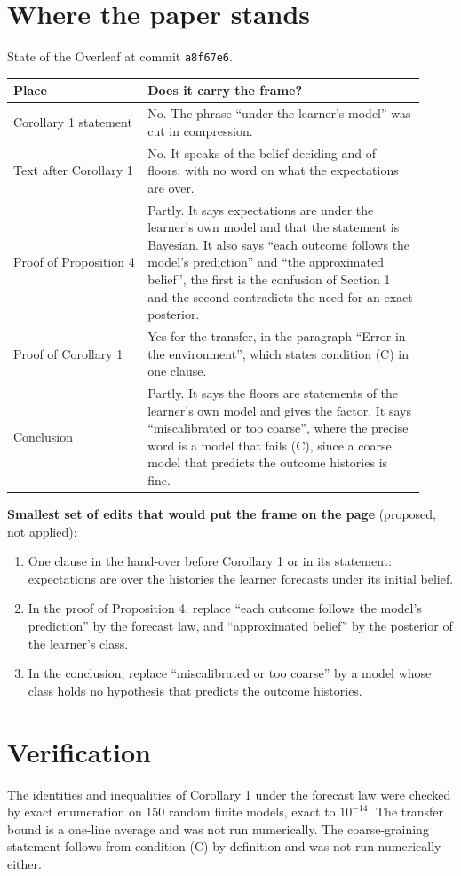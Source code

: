 \documentclass[10pt]{article}
\begin{document}
\section{Where the paper stands}
\label{sec:status}
State of the Overleaf at commit \texttt{a8f67e6}.
\begin{center}
\begin{tabular}{p{0.3\linewidth}p{0.62\linewidth}}
\toprule
Place & Does it carry the frame? \\
\midrule
Corollary 1 statement & No. The phrase ``under the learner's model'' was cut in compression. \\
Text after Corollary 1 & No. It speaks of the belief deciding and of floors, with no word on what the expectations are over. \\
Proof of Proposition 4 & Partly. It says expectations are under the learner's own model and that the statement is Bayesian. It also says ``each outcome follows the model's prediction'' and ``the approximated belief'', the first is the confusion of Section 1 and the second contradicts the need for an exact posterior. \\
Proof of Corollary 1 & Yes for the transfer, in the paragraph ``Error in the environment'', which states condition (C) in one clause. \\
Conclusion & Partly. It says the floors are statements of the learner's own model and gives the factor. It says ``miscalibrated or too coarse'', where the precise word is a model that fails (C), since a coarse model that predicts the outcome histories is fine. \\
\bottomrule
\end{tabular}
\end{center}

\noindent\textbf{Smallest set of edits that would put the frame on the page} (proposed, not applied):
\begin{enumerate}
  \item One clause in the hand-over before Corollary 1 or in its statement: expectations are over the histories the learner forecasts under its initial belief.
  \item In the proof of Proposition 4, replace ``each outcome follows the model's prediction'' by the forecast law, and ``approximated belief'' by the posterior of the learner's class.
  \item In the conclusion, replace ``miscalibrated or too coarse'' by a model whose class holds no hypothesis that predicts the outcome histories.
\end{enumerate}

\section{Verification}
The identities and inequalities of Corollary 1 under the forecast law were checked by exact enumeration on 150 random finite models, exact to $10^{-14}$.
The transfer bound is a one-line average and was not run numerically.
The coarse-graining statement follows from condition (C) by definition and was not run numerically either.
\end{document}
